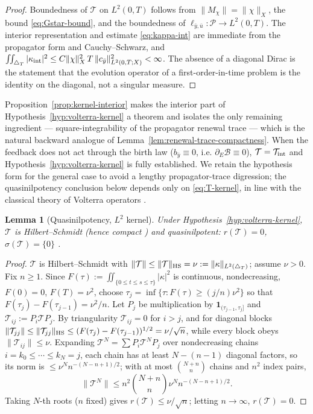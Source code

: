 \documentclass[pdflatex,sn-mathphys-num]{sn-jnl}
\theoremstyle{plain}
\newtheorem{lemma}[theorem]{Lemma}
\theoremstyle{definition}
\theoremstyle{remark}
\begin{document}
\begin{proof}
Boundedness of $\mathcal T$ on $L^2(0,T)$ follows from
$\|M_\chi\|=\|\chi\|_X$, the bound \eqref{eq:Gstar-bound}, and the
boundedness of $\ell_{\bar y,\bar u}:\mathcal P\to L^2(0,T)$. The interior
representation and estimate \eqref{eq:kappa-int} are immediate from the
propagator form and Cauchy--Schwarz, and
$\int\!\!\int_{\triangle_T}|\kappa_{\rm int}|^2\le C\|\chi\|_X^2\,T\,
\|c_{\bar y}\|_{L^2(0,T;X)}^2<\infty$. The absence of a diagonal Dirac is the
statement that the evolution operator of a first-order-in-time problem is the
identity on the diagonal, not a singular measure.
\end{proof}

Proposition~\ref{prop:kernel-interior} makes the interior part of
Hypothesis~\ref{hyp:volterra-kernel} a theorem and isolates the only remaining
ingredient --- square-integrability of the propagator renewal trace --- which
is the natural backward analogue of Lemma~\ref{lem:renewal-trace-compactness}.
When the feedback does not act through the birth law ($b_{\bar y}\equiv0$, i.e.
$\partial_E \mathcal B\equiv0$), $\mathcal T=\mathcal T_{\rm int}$ and
Hypothesis~\ref{hyp:volterra-kernel} is fully established. We retain the
hypothesis form for the general case to avoid a lengthy propagator-trace
digression; the quasinilpotency conclusion below depends only on
\eqref{eq:T-kernel}, in line with the classical theory of Volterra operators
\cite{gohberg1970theory,yu2026fullcovariance}.

\begin{lemma}[Quasinilpotency, $L^2$ kernel]
\label{lem:quasinilpotent}
Under Hypothesis~\ref{hyp:volterra-kernel}, $\mathcal T$ is Hilbert--Schmidt
(hence compact \cite{brezis2011functional}) and quasinilpotent: $r(\mathcal T)=0$,
$\sigma(\mathcal T)=\{0\}$ \cite{gohberg1970theory}.
\end{lemma}

\begin{proof}
$\mathcal T$ is Hilbert--Schmidt with $\|\mathcal T\|\le\|\mathcal T\|_{\rm
HS}=\nu:=\|\kappa\|_{L^2(\triangle_T)}$; assume $\nu>0$. Fix $n\ge1$. Since
$F(\tau):=\iint_{\{0\le t\le s\le\tau\}}|\kappa|^2$ is continuous,
nondecreasing, $F(0)=0$, $F(T)=\nu^2$, choose
$\tau_j=\inf\{\tau:F(\tau)\ge(j/n)\nu^2\}$ so that
$F(\tau_j)-F(\tau_{j-1})=\nu^2/n$. Let $P_j$ be multiplication by
$\mathbf1_{(\tau_{j-1},\tau_j]}$ and $\mathcal T_{ij}:=P_i\mathcal T P_j$. By
triangularity $\mathcal T_{ij}=0$ for $i>j$, and for diagonal blocks
$\|\mathcal T_{jj}\|\le\|\mathcal T_{jj}\|_{\rm HS}\le(F(\tau_j)-
F(\tau_{j-1}))^{1/2}=\nu/\sqrt n$, while every block obeys
$\|\mathcal T_{ij}\|\le\nu$. Expanding $\mathcal T^N=\sum P_i\mathcal T^N P_j$
over nondecreasing chains $i=k_0\le\cdots\le k_N=j$, each chain has at least
$N-(n-1)$ diagonal factors, so its norm is
$\le\nu^N n^{-(N-n+1)/2}$; with at most $\binom{N+n}{n}$ chains and $n^2$ index
pairs,
\[
\|\mathcal T^N\|\le n^2\binom{N+n}{n}\nu^N n^{-(N-n+1)/2}.
\]
Taking $N$-th roots ($n$ fixed) gives $r(\mathcal T)\le\nu/\sqrt n$; letting
$n\to\infty$, $r(\mathcal T)=0$.
\end{proof}
\end{document}
